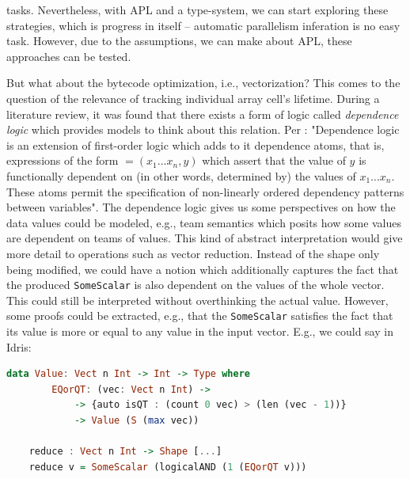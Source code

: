 \documentclass{report}
\begin{document}
tasks. Nevertheless, with APL and a type-system, we can start exploring these strategies, which is progress in itself -- automatic parallelism inferation is no easy task. However, due to the assumptions, we can make about APL, these approaches can be tested.

But what about the bytecode optimization, i.e., vectorization? This comes to the question of the relevance of tracking individual array cell's lifetime. During a literature review, it was found that there exists a form of logic called \emph{dependence logic} which provides models to think about this relation. Per \cite{sep-logic-dependence}: "Dependence logic is an extension of first-order logic which adds to it dependence atoms, that is, expressions of the form $=(x_{1}...x_{n},y)$ which assert that the value of $y$ is functionally dependent on (in other words, determined by) the values of $x_{1}...x_{n}$. These atoms permit the specification of non-linearly ordered dependency patterns between variables". The dependence logic gives us some perspectives on how the data values could be modeled, e.g., team semantics \cite{hodges1997compositional} which posits how some values are dependent on teams of values. This kind of abstract interpretation would give more detail to operations such as vector reduction. Instead of the shape only being modified, we could have a notion which additionally captures the fact that the produced \verb|SomeScalar| is also dependent on the values of the whole vector. This could still be interpreted without overthinking the actual value. However, some proofs could be extracted, e.g., that the \verb|SomeScalar| satisfies the fact that its value is more or equal to any value in the input vector. E.g., we could say in Idris:

\begin{lstlisting}[language=Haskell]
    data Value: Vect n Int -> Int -> Type where
        EQorQT: (vec: Vect n Int) ->
            -> {auto isQT : (count 0 vec) > (len (vec - 1))}
            -> Value (S (max vec))
        
    reduce : Vect n Int -> Shape [...]
    reduce v = SomeScalar (logicalAND (1 (EQorQT v)))
\end{lstlisting}
\end{document}

